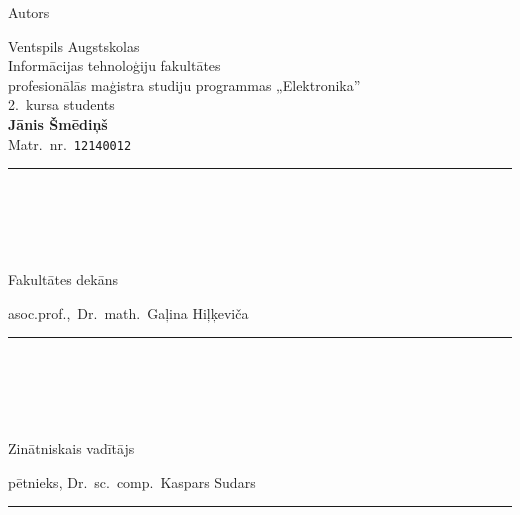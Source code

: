 \begin{titlepage}
	\normalsize
	\begin{minipage}[t]{0.3\textwidth}
		\begin{flushleft}
			Autors
		\end{flushleft}
	\end{minipage}
	\begin{minipage}[t]{0.65\textwidth}
		\begin{flushleft}
			Ventspils Augstskolas \\
			Informācijas tehnoloģiju fakultātes \\
			profesionālās maģistra studiju programmas „Elektronika”\\
			2.~kursa students \\
			\textbf{Jānis Šmēdiņš}\\
			Matr.~nr.~\texttt{12140012}\\
			\rule[-1em]{10em}{1pt}\\
			\\[1cm]
		\end{flushleft}
	\end{minipage}\\[2em]
	\begin{minipage}[t]{0.3\textwidth}
		\begin{flushleft}
			Fakultātes dekāns
		\end{flushleft}
	\end{minipage}
	\begin{minipage}[t]{0.65\textwidth}
		\begin{flushleft}
			asoc.prof.,~Dr.~math.~Gaļina Hiļķeviča\\[1ex]
			\rule[-1em]{10em}{1pt}\\
			\makebox[10em][c]{\tiny (paraksts)}\\[1cm]
		\end{flushleft}
	\end{minipage}\\[2em]
	\begin{minipage}[t]{0.3\textwidth}
		\begin{flushleft}
			Zinātniskais vadītājs
		\end{flushleft}
	\end{minipage}
	\begin{minipage}[t]{0.65\textwidth}
		\begin{flushleft}
			pētnieks, Dr.~sc.~comp.~Kaspars Sudars\\[1ex]
			\rule[-1em]{10em}{1pt}\\
			\\[1cm]

\end{flushleft}
\end{minipage}
\end{titlepage}
